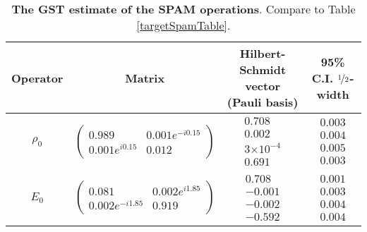 \documentclass{article}[11pt]
\providecommand{\e}[1]{\ensuremath{\times 10^{#1}}}
\begin{document}
\begin{table}[h]
\begin{center}
\begin{tabular}[l]{|c|c|c|c|}
\hline
Operator & Matrix & Hilbert-Schmidt vector (Pauli basis) & 95\% C.I. $\nicefrac{1}{2}$-width \\ \hline
$\rho_{0}$ & $ \left(\!\!\begin{array}{cc}
0.989 & 0.001e^{-i0.15} \\ 
0.001e^{i0.15} & 0.012
 \end{array}\!\!\right) $
 & $ \begin{array}{c}
0.708 \\ 
0.002 \\ 
3\e{-4} \\ 
0.691
 \end{array} $
 & $ \begin{array}{c}
0.003 \\ 
0.004 \\ 
0.005 \\ 
0.003
 \end{array} $
 \\ \hline
$E_{0}$ & $ \left(\!\!\begin{array}{cc}
0.081 & 0.002e^{i1.85} \\ 
0.002e^{-i1.85} & 0.919
 \end{array}\!\!\right) $
 & $ \begin{array}{c}
0.708 \\ 
-0.001 \\ 
-0.002 \\ 
-0.592
 \end{array} $
 & $ \begin{array}{c}
0.001 \\ 
0.003 \\ 
0.004 \\ 
0.004
 \end{array} $
 \\ \hline
\end{tabular}

\caption{\textbf{The GST estimate of the SPAM operations}.  Compare to Table \ref{targetSpamTable}.\label{bestGatesetSpamTable}}
\end{center}
\end{table}
\end{document}

